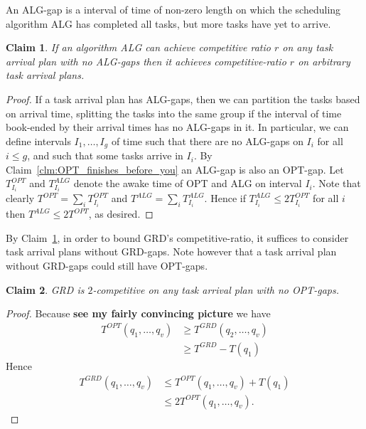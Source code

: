 \documentclass[twocolumn]{article}[10pt]
\newtheorem{clm}{Claim}
\begin{document}
An ALG-gap is a interval of time of non-zero length on which
the scheduling algorithm ALG has completed all tasks, but more
tasks have yet to arrive.
\begin{clm}
  \label{clm:just_consider_gapless}
  If an algorithm ALG can achieve competitive ratio $r$ on any
  task arrival plan with no ALG-gaps then it achieves
  competitive-ratio $r$ on arbitrary task arrival plans.
\end{clm}
\begin{proof}
  If a task arrival plan has ALG-gaps, then we can partition the
  tasks based on arrival time, splitting the tasks into the same
  group if the interval of time book-ended by their arrival times
  has no ALG-gaps in it. In particular, we can define intervals
  $I_1, \ldots, I_g$ of time such that there are no ALG-gaps on
  $I_i$ for all $i\le g$, and such that some tasks arrive in $I_i$.
  By Claim~\ref{clm:OPT_finishes_before_you} an ALG-gap is also an
  OPT-gap. 
  Let $T_{I_i}^{OPT}$ and $T_{I_i}^{ALG}$ denote the awake time
  of OPT and ALG on interval $I_i$. Note that clearly
  $T^{OPT} = \sum_{i} T_{I_i}^{OPT}$ and $T^{ALG} = \sum_{i}
  T_{I_i}^{ALG}$. Hence if $T_{I_i}^{ALG} \le 2T_{I_i}^{OPT}$ for
  all $i$ then $T^{ALG} \le 2T^{OPT}$, as desired.
  
\end{proof}

By Claim~\ref{clm:just_consider_gapless}, in order to bound GRD's
competitive-ratio, it suffices to consider task arrival plans
without GRD-gaps. Note however that a task arrival plan without
GRD-gaps could still have OPT-gaps.

\begin{clm}
  \label{clm:no_optgaps}
  GRD is $2$-competitive on any task arrival plan with no
  OPT-gaps.
\end{clm}
\begin{proof}
  Because \textbf{see my fairly convincing picture} we have
  \begin{align*}
    T^{OPT}(q_1, \ldots, q_{v}) &\ge T^{GRD}(q_2, \ldots, q_v) \\
  &\ge T^{GRD} - T(q_1)
  \end{align*}
  Hence
  \begin{align*}
    T^{GRD}(q_1, \ldots, q_v) &\le T^{OPT}(q_1, \ldots, q_v) + T(q_1) \\
                                   &\le 2T^{OPT}(q_1, \ldots, q_v).
  \end{align*}
\end{proof}
\end{document}
